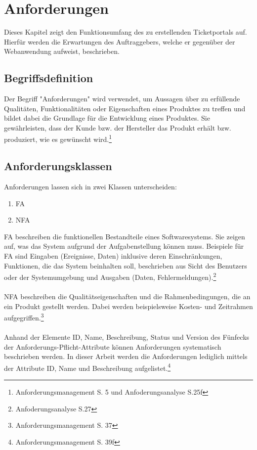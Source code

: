 \section{Anforderungen}\label{sec:requirements} %

Dieses Kapitel zeigt den Funktionsumfang des zu erstellenden Ticketportals auf. Hierfür werden die Erwartungen des Auftraggebers, welche er gegenüber der Webanwendung aufweist, beschrieben.


\subsection{Begriffsdefinition}

Der Begriff "Anforderungen" wird verwendet, um Aussagen über zu erfüllende Qualitäten, Funktionalitäten oder Eigenschaften eines Produktes zu treffen und bildet dabei die Grundlage für die Entwicklung eines Produktes. Sie gewährleisten, dass der Kunde bzw. der Hersteller das Produkt erhält bzw. produziert, wie es gewünscht wird.\footnote{Anforderungsmanagement S. 5 und Anfoderungsanalyse S.25f}


\subsection{Anforderungsklassen}

Anforderungen lassen sich in zwei Klassen unterscheiden:

\begin{enumerate}
    \item \ac{FA}
    \item \ac{NFA}
\end{enumerate}

\ac{FA} beschreiben die funktionellen Bestandteile eines Softwaresystems. Sie zeigen auf, was das System aufgrund der Aufgabenstellung können muss. Beispiele für \ac{FA} sind Eingaben (Ereignisse, Daten) inklusive deren Einschränkungen, Funktionen, die das System beinhalten soll, beschrieben aus Sicht des Benutzers oder der Systemumgebung und Ausgaben (Daten, Fehlermeldungen).\footnote{Anfoderungsanalyse S.27}
\\
\\
\ac{NFA} beschreiben die Qualitätseigenschaften und die Rahmenbedingungen, die an ein Produkt gestellt werden. Dabei werden beispielsweise Kosten- und Zeitrahmen aufgegriffen.\footnote{Anforderungsmanagement S. 37}
\\
\\
Anhand der Elemente ID, Name, Beschreibung, Status und Version des Fünfecks der Anforderungs-Pflicht-Attribute können Anforderungen systematisch beschrieben werden. In dieser Arbeit werden die Anforderungen lediglich mittels der Attribute ID, Name und Beschreibung aufgelistet.\footnote{Anforderungsmanagement S. 39f}

